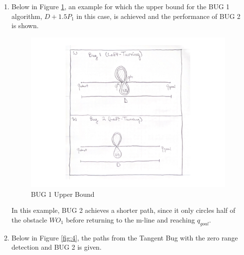 \documentclass[11pt]{article}
\begin{document}
\begin{enumerate}[leftmargin=0.3in]
\begin{enumerate}
  \end{enumerate}

  \newpage
  
  \item %
  \begin{enumerate}
    Below in Figure \ref{fig:3}, an example for which the upper bound for the BUG 1 algorithm, $D +1.5P_1$ in this case, is achieved and the performance of BUG 2 is shown.   
  
   \begin{figure}[H]
      \centering
      \includegraphics[width=12cm]{figures/problem3.png}
      \caption{BUG 1 Upper Bound}
      \label{fig:3}
   \end{figure}
    
    In this example, BUG 2 achieves a shorter path, since it only circles half of the obstacle $WO_1$ before returning to the m-line and reaching $q_{goal}$.
    
  \end{enumerate}

  \newpage

  \item %
  \begin{enumerate}
    Below in Figure \ref{fig:4}, the paths from the Tangent Bug with the zero range detection and BUG 2 is given.
    

\end{enumerate}
\end{enumerate}
\end{document}
